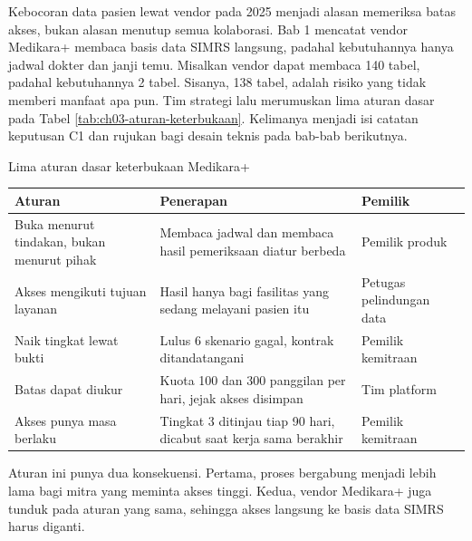 \begin{kasus}[title={Kasus Medikara Health: Aturan Dasar Keterbukaan}]
Kebocoran data pasien lewat vendor pada 2025 menjadi alasan memeriksa batas akses, bukan alasan menutup
semua kolaborasi. Bab 1 mencatat vendor Medikara+ membaca basis data SIMRS langsung, padahal kebutuhannya
hanya jadwal dokter dan janji temu. Misalkan vendor dapat membaca 140 tabel, padahal kebutuhannya 2 tabel.
Sisanya, 138 tabel, adalah risiko yang tidak memberi manfaat apa pun. Tim strategi lalu merumuskan lima aturan dasar pada Tabel \ref{tab:ch03-aturan-keterbukaan}. Kelimanya
menjadi isi catatan keputusan C1 dan rujukan bagi desain teknis pada bab-bab berikutnya.

\begin{center}
  \captionsetup{type=table}
  \caption{Lima aturan dasar keterbukaan Medikara+}
  \label{tab:ch03-aturan-keterbukaan}
  \small
  \begin{tabularx}{\linewidth}{YYZ{2.5cm}}
    \hline
    \textbf{Aturan} & \textbf{Penerapan} & \textbf{Pemilik} \\ \hline
    Buka menurut tindakan, bukan menurut pihak & Membaca jadwal dan membaca hasil pemeriksaan diatur berbeda & Pemilik produk \\ \hline
    Akses mengikuti tujuan layanan & Hasil hanya bagi fasilitas yang sedang melayani pasien itu & Petugas pelindungan data \\ \hline
    Naik tingkat lewat bukti & Lulus 6 skenario gagal, kontrak ditandatangani & Pemilik kemitraan \\ \hline
    Batas dapat diukur & Kuota 100 dan 300 panggilan per hari, jejak akses disimpan & Tim platform \\ \hline
    Akses punya masa berlaku & Tingkat 3 ditinjau tiap 90 hari, dicabut saat kerja sama berakhir & Pemilik kemitraan \\ \hline
  \end{tabularx}
\end{center}

Aturan ini punya dua konsekuensi. Pertama, proses bergabung menjadi lebih lama bagi mitra yang meminta
akses tinggi. Kedua, vendor Medikara+ juga tunduk pada aturan yang sama, sehingga akses langsung ke basis
data SIMRS harus diganti.
\end{kasus}


